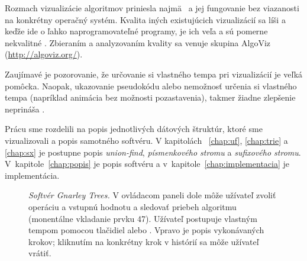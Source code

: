 Rozmach vizualizácie algoritmov priniesla najmä \Java\ a jej fungovanie 
bez viazanosti na konkrétny operačný systém. Kvalita iných existujúcich 
vizualizácií sa líši a keďže ide o ľahko naprogramovateľné programy, je ich 
veľa a sú pomerne nekvalitné \citep{shaffer}. 
Zbieraním a analyzovaním kvality sa venuje skupina AlgoViz (\hbox{\url{http://algoviz.org/}}).

Zaujímavé je pozorovanie, že určovanie si vlastného tempa pri vizualizácií 
je veľká pomôcka. Naopak, ukazovanie pseudokódu alebo nemožnosť určenia si
vlastného tempa (napríklad animácia bez možnosti pozastavenia), takmer 
žiadne zlepšenie neprináša \citep{shaffer,saraiya}.


Prácu sme rozdelili na popis jednotlivých dátových štruktúr, ktoré sme 
vizualizovali a popis samotného softvéru. V kapitolách~
\ref{chap:uf}, \ref{chap:trie} a \ref{chap:sx} je postupne popis 
\emph{union-find}, \emph{písmenkového stromu} a \emph{sufixového stromu}. 
V~kapitole~\ref{chap:popis} je popis softvéru a 
v~kapitole~\ref{chap:implementacia} je implementácia.
 
\begin{figure}
\centering
{}
\caption{\emph{Softvér Gnarley Trees.} V ovládacom paneli dole môže užívateľ
zvoliť operáciu a vstupnú hodnotu a sledovať priebeh algoritmu (monentálne vkladanie
prvku 47). Užívateľ postupuje vlastným tempom  pomocou tlačidiel  alebo
. Vpravo je popis vykonávaných krokov; kliknutím na konkrétny krok v histórií
sa môže užívateľ vrátiť.}
\label{img:historia} 
\end{figure}
